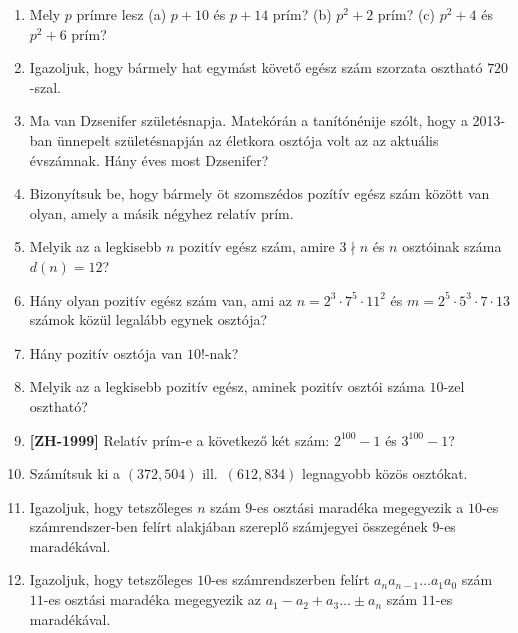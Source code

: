 \documentclass[a4paper, 12pt]{article}
\begin{document}
\begin{enumerate}
	
	\item Mely $p$ prímre lesz (a) $p+10$ és $p+14$ prím?  (b) $p^2+2$ prím?  (c) $p^2+4$ és $p^2+6$ prím? 
	\item Igazoljuk, hogy bármely hat egymást követő egész szám szorzata osztható $720$-szal.
	\item Ma van Dzsenifer születésnapja. Matekórán a tanítónénije szólt, hogy a 2013-ban  ünnepelt születésnapján az életkora osztója volt az az aktuális évszámnak. Hány éves most Dzsenifer?
	\item Bizonyítsuk be, hogy bármely öt szomszédos pozítív egész szám között van olyan, amely a másik négyhez relatív prím.
	\item Melyik az a legkisebb $n$ pozitív egész szám, amire $3\nmid n$ és $n$ osztóinak száma $d(n)=12$?
	\item Hány olyan pozitív egész szám van, ami az $n=2^3\cdot 7^5\cdot 11^2$ és $m=2^5\cdot 5^3\cdot 7\cdot 13$ számok közül legalább egynek osztója?
	\item Hány pozitív osztója van $10!$-nak?
	\item Melyik az a legkisebb pozitív egész, aminek pozitív osztói száma $10$-zel osztható?
	\item \textbf{[ZH-1999]} Relatív prím-e a következő két szám: $2^{100}-1$ és $3^{100}-1$?
	\item Számítsuk ki a $(372,504)$ ill.\ $(612,834)$ legnagyobb közös osztókat.
	\item Igazoljuk, hogy tetszőleges $n$ szám $9$-es osztási maradéka megegyezik a $10$-es számrendszer-ben felírt alakjában szereplő számjegyei összegének
$9$-es maradékával.
	\item Igazoljuk, hogy tetszőleges $10$-es számrendszerben felírt $a_na_{n-1}\ldots a_1a_0$ szám $11$-es osztási maradéka megegyezik az $a_1-a_2+a_3\ldots \pm a_n$ szám $11$-es maradékával.

\end{enumerate}
\end{document}
